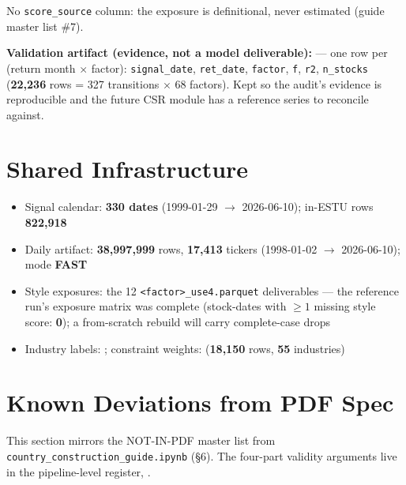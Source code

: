 \documentclass[11pt,a4paper]{article}
\begin{document}
No \texttt{score\_source} column: the exposure is definitional, never
estimated (guide master list \#7).

\smallskip
\textbf{Validation artifact (evidence, not a model deliverable):}
 --- one row per (return
month $\times$ factor): \texttt{signal\_date}, \texttt{ret\_date},
\texttt{factor}, \texttt{f}, \texttt{r2}, \texttt{n\_stocks}
(\textbf{22{,}236} rows = 327 transitions $\times$ 68 factors). Kept so the
audit's evidence is reproducible and the future CSR module has a reference
series to reconcile against.

\section{Shared Infrastructure}

\begin{itemize}[leftmargin=*,topsep=2pt,itemsep=2pt]
  \item Signal calendar: \textbf{330 dates} (1999-01-29 $\to$ 2026-06-10); in-ESTU rows \textbf{822{,}918}
  \item Daily artifact: \textbf{38{,}997{,}999} rows, \textbf{17{,}413} tickers (1998-01-02 $\to$ 2026-06-10); mode \textbf{FAST}
  \item Style exposures: the 12 \texttt{<factor>\_use4.parquet} deliverables --- the reference run's exposure matrix was complete (stock-dates with $\geq 1$ missing style score: \textbf{0}); a from-scratch rebuild will carry complete-case drops
  \item Industry labels: ; constraint weights:  (\textbf{18{,}150} rows, \textbf{55} industries)
\end{itemize}

\section{Known Deviations from PDF Spec}

This section mirrors the NOT-IN-PDF master list from
\texttt{country\_construction\_guide.ipynb} (\S6). The four-part validity
arguments live in the pipeline-level register,
.
\end{document}
